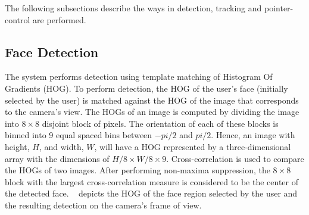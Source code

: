 The following subsections describe the ways in detection, tracking and pointer-control are performed. 

\subsection{Face Detection}

The system performs detection using template matching of Histogram Of Gradients (HOG). To perform detection, the HOG of the user's face (initially selected by the user) is matched against the HOG of the image that corresponds to the camera's view. The HOGs of an image is computed by dividing the image into $8\times8$ disjoint block of pixels. The orientation of each of these blocks is binned into 9 equal spaced bins between $-pi/2$ and $pi/2$. Hence, an image with height, $H$, and width, $W$, will have a HOG represented by a three-dimensional array with the dimensions of $H/8 \times W/8 \times 9$. Cross-correlation is used to compare the HOGs of two images. After performing non-maxima suppression, the $8 \times 8$ block with the largest cross-correlation measure is considered to be the center of the detected face. ~ depicts the HOG of the face region selected by the user and the resulting detection on the camera's frame of view.

